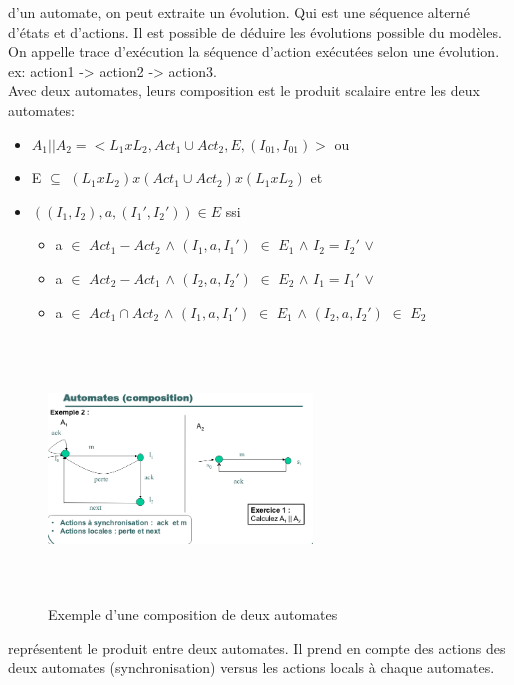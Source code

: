 \documentclass[oneside]{book}
\begin{document}
    d'un automate, on peut extraite un évolution. Qui est une séquence alterné d'états et d'actions. Il est possible de déduire les évolutions possible du modèles. On appelle trace d'exécution la séquence d'action exécutées selon une évolution. ex: action1 -> action2 -> action3.\\
    
    Avec deux automates, leurs composition est le produit scalaire entre les deux automates:
    \begin{itemize}
    	\item $A_1 \lvert\lvert A_2 = <L_1 x L_2, Act_1 \cup Act_2, E, (I_{01},I_{01})>$ ou
    	\item E $\subseteq$ $(L_1 x L_2) x (Act_1 \cup Act_2) x (L_1 x L_2)$ et
    	\item $((I_1, I_2), a, (I_1', I_2')) \in E$ ssi
    	\begin{itemize}
    		\item a $\in$ $Act_1 - Act_2$ $\land$ $(I_1, a, I_1')$ $\in$ $E_1$ $\land$ $I_2=I_2'$ $\lor$
    		\item a $\in$ $Act_2 - Act_1$ $\land$ $(I_2, a, I_2')$ $\in$ $E_2$ $\land$ $I_1=I_1'$ $\lor$
    		\item a $\in$ $Act_1 \cap Act_2$ $\land$ $(I_1, a, I_1')$ $\in$ $E_1$ $\land$ $(I_2, a, I_2')$ $\in$ $E_2$
    	\end{itemize}
    \end{itemize}
    
    \begin{figure}[!ht]
    	\centering
    	\includegraphics[width = 7cm, height = 7cm, keepaspectratio]{Images/composition_automate.png}
    	\caption{Exemple d'une composition de deux automates}
    	\label{fig:CompositionAutomate}
    \end{figure}
    
    représentent le produit entre deux automates. Il prend en compte des actions des deux automates (synchronisation) versus les actions locals à chaque automates.\\
    
\end{document}
